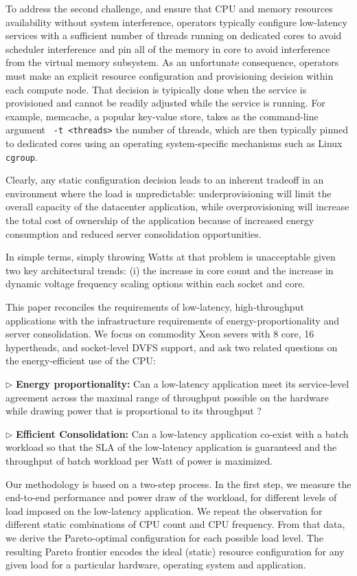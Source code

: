 To address the second challenge, and ensure that CPU and memory
resources availability without system interference, operators
typically configure low-latency services with a sufficient number of
threads running on dedicated cores to avoid scheduler interference and
pin all of the memory in core to avoid interference from the virtual
memory subsystem. As an unfortunate consequence, operators must make
an explicit resource configuration and provisioning decision within
each compute node.  That decision is tyipically done when the service
is provisioned and cannot be readily adjusted while the service is
running.  For example, memcache, a popular key-value store, takes as
the command-line argument \texttt{ -t <threads>} the number of
threads, which are then typically pinned to dedicated cores using an
operating system-specific mechanisms such as Linux \texttt{cgroup}.


Clearly, any static configuration decision leads to an inherent
tradeoff in an environment where the load is unpredictable:
underprovisioning will limit the overall capacity of the datacenter
application, while overprovisioning will increase the total cost of
ownership of the application because of increased energy consumption
and reduced server consolidation opportunities.

In simple terms, simply throwing Watts at that problem is unacceptable
given two key architectural trends: (i) the increase in core count and
the increase in dynamic voltage frequency scaling options within each
socket and core. 

This paper reconciles the requirements of low-latency, high-throughput
applications with the infrastructure requirements of
energy-proportionality and server consolidation.  We focus on
commodity Xeon severs with 8 core, 16 hypertheads, and socket-level
DVFS support, and ask two related questions on the  energy-efficient use of the CPU:

$\triangleright$ {\bf Energy proportionality:} Can a low-latency
application meet its service-level agreement across the maximal range
of throughput possible on the hardware while drawing power that is
proportional to its throughput ? 

$\triangleright$ {\bf Efficient Consolidation:} Can a low-latency application
co-exist with a batch workload so that the SLA of the low-latency
application is guaranteed and the throughput of batch workload per
Watt of power is maximized.


Our methodology is based on a two-step process.  In the first step, we
measure the end-to-end performance and power draw of the workload, for
different levels of load imposed on the low-latency application.  We
repeat the observation for different static combinations of CPU count
and CPU frequency.  From that data, we derive the Pareto-optimal
configuration for each possible load level.  The resulting
Pareto frontier encodes the ideal (static) resource
configuration for any given load for a particular hardware, operating
system and application.


